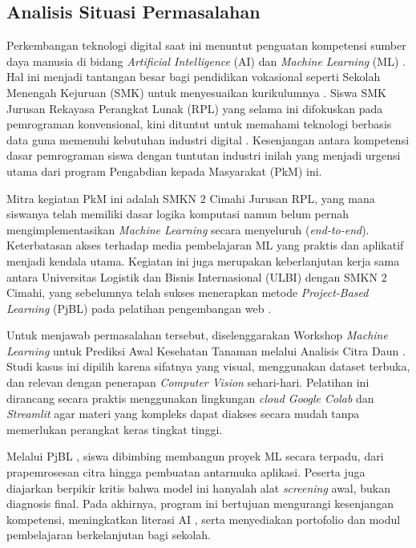 \subsection{Analisis Situasi Permasalahan}

Perkembangan teknologi digital saat ini menuntut penguatan kompetensi sumber daya manusia di bidang \textit{Artificial Intelligence} (AI) dan \textit{Machine Learning} (ML) \parencite{Nadzinski2023}. Hal ini menjadi tantangan besar bagi pendidikan vokasional seperti Sekolah Menengah Kejuruan (SMK) untuk menyesuaikan kurikulumnya \parencite{Utomo2024}. Siswa SMK Jurusan Rekayasa Perangkat Lunak (RPL) yang selama ini difokuskan pada pemrograman konvensional, kini dituntut untuk memahami teknologi berbasis data guna memenuhi kebutuhan industri digital \parencite{Hidayat2026, Andriani2025}. Kesenjangan antara kompetensi dasar pemrograman siswa dengan tuntutan industri inilah yang menjadi urgensi utama dari program Pengabdian kepada Masyarakat (PkM) ini.

Mitra kegiatan PkM ini adalah SMKN 2 Cimahi Jurusan RPL, yang mana siswanya telah memiliki dasar logika komputasi namun belum pernah mengimplementasikan \textit{Machine Learning} secara menyeluruh (\textit{end-to-end}). Keterbatasan akses terhadap media pembelajaran ML yang praktis dan aplikatif menjadi kendala utama. Kegiatan ini juga merupakan keberlanjutan kerja sama antara Universitas Logistik dan Bisnis Internasional (ULBI) dengan SMKN 2 Cimahi, yang sebelumnya telah sukses menerapkan metode \textit{Project-Based Learning} (PjBL) pada pelatihan pengembangan web \parencite{PANE2025}.

Untuk menjawab permasalahan tersebut, diselenggarakan Workshop \textit{Machine Learning} untuk Prediksi Awal Kesehatan Tanaman melalui Analisis Citra Daun \parencite{Imanulloh2023, MarwanRamdhanyEdy2025}. Studi kasus ini dipilih karena sifatnya yang visual, menggunakan dataset terbuka, dan relevan dengan penerapan \textit{Computer Vision} sehari-hari. Pelatihan ini dirancang secara praktis menggunakan lingkungan \textit{cloud Google Colab} \parencite{Handayani2025, Nugrahanti2025} dan \textit{Streamlit} agar materi yang kompleks dapat diakses secara mudah tanpa memerlukan perangkat keras tingkat tinggi. 

Melalui PjBL \parencite{Wahyudi2024, Wibowo2026}, siswa dibimbing membangun proyek ML secara terpadu, dari prapemrosesan citra hingga pembuatan antarmuka aplikasi. Peserta juga diajarkan berpikir kritis bahwa model ini hanyalah alat \textit{screening} awal, bukan diagnosis final. Pada akhirnya, program ini bertujuan mengurangi kesenjangan kompetensi, meningkatkan literasi AI \parencite{Panjaitan2025}, serta menyediakan portofolio dan modul pembelajaran berkelanjutan bagi sekolah.

